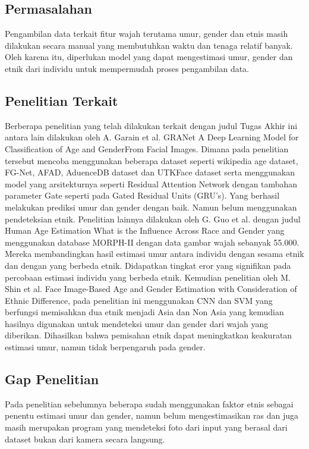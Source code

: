 \subsection{Permasalahan}

Pengambilan data terkait fitur wajah terutama umur, gender dan etnis masih dilakukan secara manual yang 
membutuhkan waktu dan tenaga relatif banyak. Oleh karena itu, diperlukan model yang dapat mengestimasi 
umur, gender dan etnik dari individu untuk mempermudah proses pengambilan data.

\subsection{Penelitian Terkait}

Berberapa penelitian yang telah dilakukan terkait dengan judul Tugas Akhir ini antara lain dilakukan oleh 
A. Garain et al. GRANet A Deep Learning Model for Classification of Age and GenderFrom Facial Images. 
Dimana pada penelitian tersebut mencoba menggunakan beberapa dataset seperti wikipedia age dataset, 
FG-Net, AFAD, AduenceDB dataset dan UTKFace dataset serta menggunakan model yang arsitekturnya seperti 
Residual Attention Network dengan tambahan parameter Gate seperti pada Gated Residual Units (GRU’s). 
Yang berhasil melakukan prediksi umur dan gender dengan baik. Namun belum menggunakan pendeteksian etnik\citep{Granet}. 
Penelitian lainnya dilakukan oleh G. Guo et al. dengan judul Human Age Estimation What is the Influence 
Across Race and Gender yang menggunakan database MORPH-II dengan data gambar wajah sebanyak 55.000. 
Mereka membandingkan hasil estimasi umur antara individu dengan sesama etnik dan dengan yang berbeda 
etnik. Didapatkan tingkat eror yang signifikan pada percobaan estimasi individu  yang  berbeda etnik\citep{AgeGender}. 
Kemudian penelitian oleh M. Shin et al. Face Image-Based Age and Gender Estimation with Consideration of 
Ethnic Difference, pada penelitian ini menggunakan CNN dan SVM yang berfungsi memisahkan dua etnik 
menjadi Asia dan Non Asia yang kemudian hasilnya digunakan untuk mendeteksi umur dan gender dari wajah 
yang diberikan. Dihasilkan bahwa pemisahan etnik dapat meningkatkan keakuratan estimasi umur, namun tidak 
berpengaruh pada gender\citep{HumanAgeEst}.

\subsection{Gap Penelitian}
Pada penelitian sebelumnya beberapa sudah menggunakan faktor etnis sebagai penentu estimasi umur dan 
gender, namun belum mengestimasikan ras dan juga masih merupakan program yang mendeteksi foto dari input 
yang berasal dari dataset bukan dari kamera secara langsung.

